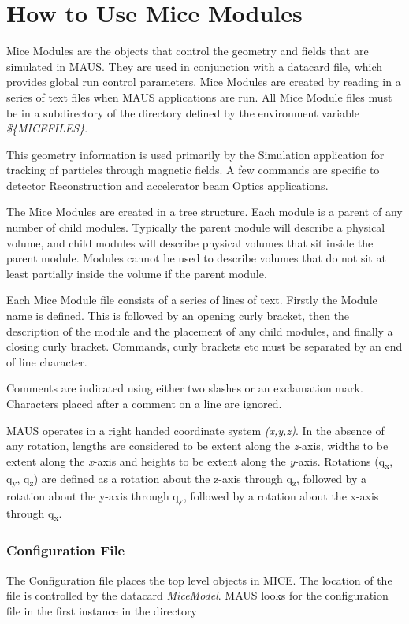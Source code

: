 \chapter{How to Use Mice Modules}
Mice Modules are the objects that control the geometry and fields that are simulated in MAUS. They are used in
conjunction with a datacard file, which provides global run control parameters. Mice Modules are created by reading in
a series of text files when MAUS applications are run. All Mice Module files must be in a subdirectory of the
directory defined by the environment variable \textit{\$\{MICEFILES\}}.

This geometry information is used primarily by the Simulation application for tracking of particles through magnetic
fields. A few commands are specific to detector Reconstruction and accelerator beam Optics applications.

The Mice Modules are created in a tree structure. Each module is a parent of any number of child modules. Typically the
parent module will describe a physical volume, and child modules will describe physical volumes that sit inside the
parent module. Modules cannot be used to describe volumes that do not sit at least partially inside the volume if the
parent module.

Each Mice Module file consists of a series of lines of text. Firstly the Module name is defined. This is followed by an
opening curly bracket, then the description of the module and the placement of any child modules, and finally a closing
curly bracket. Commands, curly brackets etc must be separated by an end of line character.

Comments are indicated using either two slashes or an exclamation mark. Characters placed after a comment on a line are
ignored.

MAUS operates in a right handed coordinate system \textit{(x,y,z)}. In the absence of any rotation, lengths are
considered to be extent along the \textit{z}{}-axis, widths to be extent along the \textit{x}{}-axis and heights to be
extent along the \textit{y}{}-axis. Rotations (q\textsubscript{x}, q\textsubscript{y}, q\textsubscript{z}) are defined
as a rotation about the z-axis through q\textsubscript{z}, followed by a rotation about the y-axis through
q\textsubscript{y}, followed by a rotation about the x-axis through q\textsubscript{x}.

\subsection{Configuration File}
The Configuration file places the top level objects in MICE. The location of the file is controlled by the datacard
\textit{MiceModel}. MAUS looks for the configuration file in the first instance in the directory


